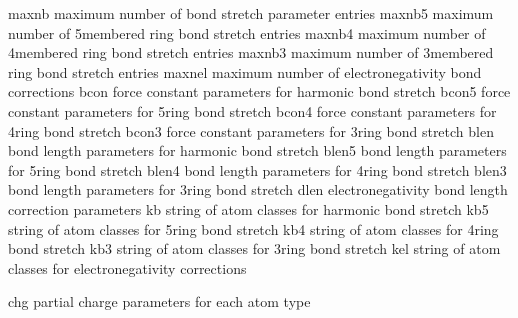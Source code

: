 \documentclass[letterpaper,11pt,english]{sphinxmanual}
\begin{document}

\begin{sphinxVerbatim}[commandchars=\\\{\}]
maxnb           maximum number of bond stretch parameter entries
maxnb5          maximum number of 5\PYGZhy{}membered ring bond stretch entries
maxnb4          maximum number of 4\PYGZhy{}membered ring bond stretch entries
maxnb3          maximum number of 3\PYGZhy{}membered ring bond stretch entries
maxnel          maximum number of electronegativity bond corrections
bcon            force constant parameters for harmonic bond stretch
bcon5           force constant parameters for 5\PYGZhy{}ring bond stretch
bcon4           force constant parameters for 4\PYGZhy{}ring bond stretch
bcon3           force constant parameters for 3\PYGZhy{}ring bond stretch
blen            bond length parameters for harmonic bond stretch
blen5           bond length parameters for 5\PYGZhy{}ring bond stretch
blen4           bond length parameters for 4\PYGZhy{}ring bond stretch
blen3           bond length parameters for 3\PYGZhy{}ring bond stretch
dlen            electronegativity bond length correction parameters
kb              string of atom classes for harmonic bond stretch
kb5             string of atom classes for 5\PYGZhy{}ring bond stretch
kb4             string of atom classes for 4\PYGZhy{}ring bond stretch
kb3             string of atom classes for 3\PYGZhy{}ring bond stretch
kel             string of atom classes for electronegativity corrections
\end{sphinxVerbatim}


\begin{sphinxVerbatim}[commandchars=\\\{\}]
chg             partial charge parameters for each atom type
\end{sphinxVerbatim}

\end{document}
